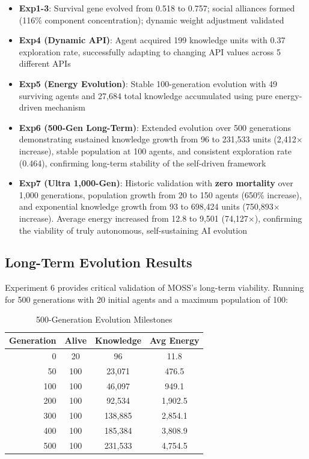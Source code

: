 \documentclass[10pt,a4paper]{article}
\begin{document}
\begin{itemize}
    \item \textbf{Exp1-3}: Survival gene evolved from 0.518 to 0.757; social alliances formed (116\% component concentration); dynamic weight adjustment validated
    \item \textbf{Exp4 (Dynamic API)}: Agent acquired 199 knowledge units with 0.37 exploration rate, successfully adapting to changing API values across 5 different APIs
    \item \textbf{Exp5 (Energy Evolution)}: Stable 100-generation evolution with 49 surviving agents and 27,684 total knowledge accumulated using pure energy-driven mechanism
    \item \textbf{Exp6 (500-Gen Long-Term)}: Extended evolution over 500 generations demonstrating sustained knowledge growth from 96 to 231,533 units (2,412$\times$ increase), stable population at 100 agents, and consistent exploration rate (0.464), confirming long-term stability of the self-driven framework
    \item \textbf{Exp7 (Ultra 1,000-Gen)}: Historic validation with \textbf{zero mortality} over 1,000 generations, population growth from 20 to 150 agents (650\% increase), and exponential knowledge growth from 93 to 698,424 units (750,893$\times$ increase). Average energy increased from 12.8 to 9,501 (74,127$\times$), confirming the viability of truly autonomous, self-sustaining AI evolution
\end{itemize}

\subsection{Long-Term Evolution Results}

Experiment 6 provides critical validation of MOSS's long-term viability. Running for 500 generations with 20 initial agents and a maximum population of 100:

\begin{table}[h]
\centering
\caption{500-Generation Evolution Milestones}
\begin{tabular}{@{}rccc@{}}
\toprule
\textbf{Generation} & \textbf{Alive} & \textbf{Knowledge} & \textbf{Avg Energy} \\
\midrule
0 & 20 & 96 & 11.8 \\
50 & 100 & 23,071 & 476.5 \\
100 & 100 & 46,097 & 949.1 \\
200 & 100 & 92,534 & 1,902.5 \\
300 & 100 & 138,885 & 2,854.1 \\
400 & 100 & 185,384 & 3,808.9 \\
500 & 100 & 231,533 & 4,754.5 \\
\bottomrule
\end{tabular}
\end{table}
\end{document}
